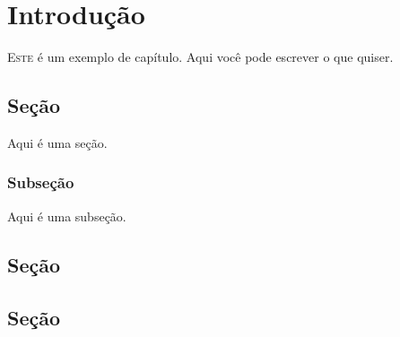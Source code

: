 \chapter{Introdução}

\lettrine{E}{ste} é um exemplo de capítulo. Aqui você pode escrever o que quiser.

\section{Seção}

Aqui é uma seção.

\subsection{Subseção}

Aqui é uma subseção.

\lipsum[1-5]

\section{Seção}

\lipsum[6-10]

\section{Seção}

\lipsum[11-15]


